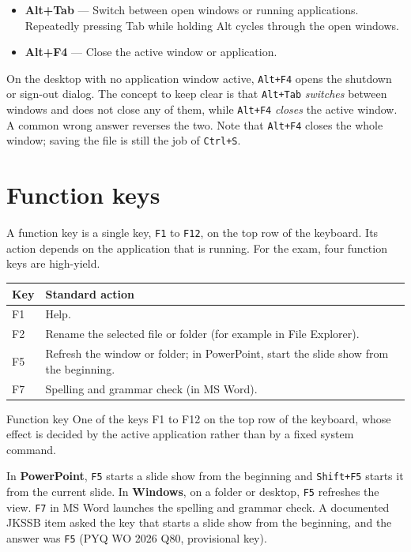 \begin{itemize}
  \item \textbf{Alt+Tab} --- Switch between open windows or running
    applications. Repeatedly pressing Tab while holding Alt cycles through the
    open windows.
  \item \textbf{Alt+F4} --- Close the active window or application.
\end{itemize}

On the desktop with no application window active, \texttt{Alt+F4} opens the
shutdown or sign-out dialog. The concept to keep clear is that \texttt{Alt+Tab}
\emph{switches} between windows and does not close any of them, while
\texttt{Alt+F4} \emph{closes} the active window. A common wrong answer reverses
the two. Note that \texttt{Alt+F4} closes the whole window; saving the file is
still the job of \texttt{Ctrl+S}.

\section{Function keys}
A function key is a single key, \texttt{F1} to \texttt{F12}, on the top row of
the keyboard. Its action depends on the application that is running. For the
exam, four function keys are high-yield.

\begin{center}
\begin{tabular}{p{}p{}}
\toprule
\textbf{Key} & \textbf{Standard action} \\
\midrule
F1 & Help. \\
F2 & Rename the selected file or folder (for example in File Explorer). \\
F5 & Refresh the window or folder; in PowerPoint, start the slide show from
     the beginning. \\
F7 & Spelling and grammar check (in MS Word). \\
\bottomrule
\end{tabular}
\end{center}

\begin{definitionbox}{Function key}
One of the keys F1 to F12 on the top row of the keyboard, whose effect is
decided by the active application rather than by a fixed system command.
\end{definitionbox}

In \textbf{PowerPoint}, \texttt{F5} starts a slide show from the beginning and
\texttt{Shift+F5} starts it from the current slide. In \textbf{Windows}, on a
folder or desktop, \texttt{F5} refreshes the view. \texttt{F7} in MS Word
launches the spelling and grammar check. A documented JKSSB item asked the key
that starts a slide show from the beginning, and the answer was \texttt{F5}
(PYQ WO 2026 Q80, provisional key).


